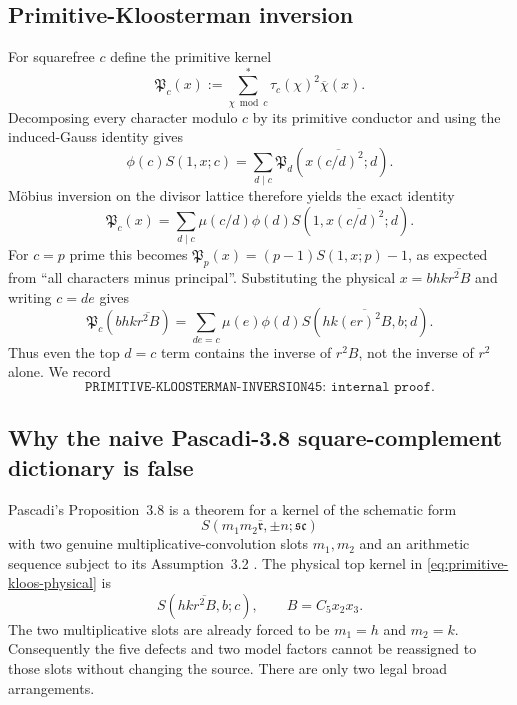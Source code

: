 \documentclass[11pt]{article}
\theoremstyle{definition}
\newcommand{\1}{\mathbf 1}
\begin{document}
\subsection{Primitive-Kloosterman inversion}

For squarefree $c$ define the primitive kernel
\[
 \mathfrak P_c(x):=
 \sum_{\chi\bmod c}^{*}\tau_c(\chi)^2\overline\chi(x).
\]
Decomposing every character modulo $c$ by its primitive conductor and using
the induced-Gauss identity gives
\[
 \phi(c)S(1,x;c)
 =\sum_{d\mid c}
   \mathfrak P_d\!\left(x\overline{(c/d)^2};d\right).
\]
M\"obius inversion on the divisor lattice therefore yields the exact identity
\begin{equation}
 \boxed{
 \mathfrak P_c(x)
 =\sum_{d\mid c}\mu(c/d)\phi(d)
 S\!\left(1,x\overline{(c/d)^2};d\right).
 }
 \label{eq:primitive-kloos-inversion}
\end{equation}
For $c=p$ prime this becomes
$\mathfrak P_p(x)=(p-1)S(1,x;p)-1$, as expected from ``all characters minus
principal''.  Substituting the physical
$x=bhk\overline{r^2B}$ and writing $c=de$ gives
\begin{equation}
 \boxed{
 \mathfrak P_c\!\left(bhk\overline{r^2B}\right)
 =\sum_{de=c}\mu(e)\phi(d)
 S\!\left(hk\overline{(er)^2B},b;d\right).
 }
 \label{eq:primitive-kloos-physical}
\end{equation}
Thus even the top $d=c$ term contains the inverse of $r^2B$, not the inverse
of $r^2$ alone.  We record
\[
 \boxed{\texttt{PRIMITIVE-KLOOSTERMAN-INVERSION45: internal proof}.}
\]

\subsection{Why the naive Pascadi-3.8 square-complement dictionary is false}

Pascadi's Proposition~3.8 is a theorem for a kernel of the schematic form
\[
 S(m_1m_2\overline{\mathfrak r},\pm n;\mathfrak s\mathfrak c)
\]
with two genuine multiplicative-convolution slots $m_1,m_2$ and an arithmetic
sequence subject to its Assumption~3.2 \cite{Pascadi2025}.  The physical top
kernel in \eqref{eq:primitive-kloos-physical} is
\[
 \boxed{S(hk\overline{r^2B},b;c),\qquad B=C_5x_2x_3.}
\]
The two multiplicative slots are already forced to be $m_1=h$ and $m_2=k$.
Consequently the five defects and two model factors cannot be reassigned to
those slots without changing the source.  There are only two legal broad
arrangements.
\end{document}
